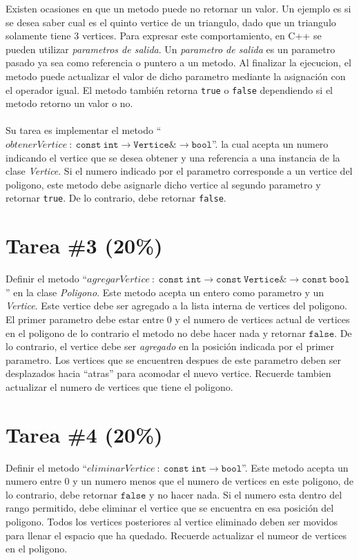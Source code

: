 \documentclass{article}
\begin{document}
Existen ocasiones en que un metodo puede no retornar un valor. Un ejemplo es si
se desea saber cual es el quinto vertice de un triangulo, dado que un triangulo
solamente tiene 3 vertices. Para expresar este comportamiento, en C++ se pueden
utilizar \emph{parametros de salida}. Un \emph{parametro de salida} es un parametro
pasado ya sea como referencia o puntero a un metodo. Al finalizar la ejecucion,
el metodo puede actualizar el valor de dicho parametro mediante la asignaci\'on
con el operador igual. El metodo tambi\'en retorna \texttt{true} o \texttt{false}
dependiendo si el metodo retorno un valor o no.
\\\\
Su tarea es implementar el metodo ``$obtenerVertice\ :\ \mathtt{const\ int}\rightarrow\mathtt{Vertice\&}\rightarrow \mathtt{bool}$''.
la cual acepta un numero indicando el vertice que se desea obtener y una referencia a una
instancia de la clase \emph{Vertice}. Si el numero indicado por el parametro corresponde
a un vertice del poligono, este metodo debe asignarle dicho vertice al segundo parametro
y retornar \texttt{true}. De lo contrario, debe retornar \texttt{false}.

\section*{Tarea \#3 (20\%)}

Definir el metodo ``$agregarVertice\ :\ \mathtt{const\ int}\rightarrow \mathtt{const\ Vertice\&}\rightarrow \mathtt{const\ bool}$''
en la clase \emph{Poligono}. Este metodo acepta un entero como parametro y un \emph{Vertice}. Este vertice debe ser agregado
a la lista interna de vertices del poligono. El primer parametro debe estar entre 0 y el numero
de vertices actual de vertices en el poligono de lo contrario el metodo no debe hacer nada
y retornar $\mathtt{false}$. De lo contrario, el vertice debe ser \emph{agregado} en la posici\'on
indicada por el primer parametro. Los vertices que se encuentren despues de este parametro deben
ser desplazados hacia ``atras'' para acomodar el nuevo vertice. Recuerde tambien actualizar
el numero de vertices que tiene el poligono.


\section*{Tarea \#4 (20\%)}
Definir el metodo ``$eliminarVertice\ :\ \mathtt{const\ int}\rightarrow\mathtt{bool}$''. Este
metodo acepta un numero entre 0 y un numero menos que el numero de vertices en este poligono, de
lo contrario, debe retornar $\mathtt{false}$ y no hacer nada. Si el numero esta dentro del
rango permitido, debe eliminar el vertice que se encuentra en esa posici\'on del poligono.
Todos los vertices posteriores al vertice eliminado deben ser movidos para llenar el espacio
que ha quedado. Recuerde actualizar el numeor de vertices en el poligono.
\end{document}
